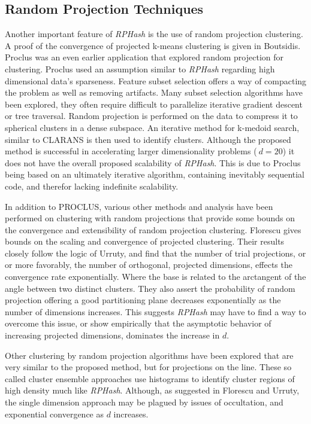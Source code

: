 \documentclass[a4paper,10pt]{article}
\begin{document}
\subsection{Random Projection Techniques} Another important feature of
\emph{RPHash} is the use of random projection clustering.  A proof
of the convergence of projected k-means clustering is given in
Boutsidis\cite{Boutsidis}.  Proclus\cite{Proclus} was an even earlier
application that explored random projection for clustering.  Proclus used
an assumption similar to \emph{RPHash} regarding high dimensional data's
sparseness.  Feature subset selection offers a way of compacting the
problem as well as removing artifacts.	Many subset selection algorithms
have been explored\cite{subset1,subset2,Yang,Kaski98}, they often require
difficult to parallelize iterative gradient descent\cite{Amdahl} or tree
traversal\cite{Freeman}.  Random projection is performed on the data to
compress it to spherical clusters\cite{Dasgupta2000} in a dense subspace.
An iterative method for k-medoid search, similar to CLARANS\cite{Clarans} is
then used to identify clusters.  Although the proposed method is successful
in accelerating larger dimensionality problems ($~d=20$) it does not have
the overall proposed scalability of \emph{RPHash}.  This is due to Proclus
being based on an ultimately iterative algorithm, containing inevitably
sequential code, and therefor lacking indefinite scalability\cite{Amdahl}.

In addition to PROCLUS, various other methods and analysis have been
performed on clustering with random projections that provide some bounds on the
convergence and extensibility of random projection clustering.	Florescu gives
bounds on the scaling and convergence of projected clustering\cite{florescu09}.
Their results closely follow the logic of Urruty\cite{Urruty2007}, and find
that the number of trial projections, or or more favorably, the number of
orthogonal, projected dimensions, effects the convergence rate exponentially.
Where the base is related to the arctangent of the angle between two distinct
clusters.  They also assert the probability of random projection offering a
good partitioning plane decreases exponentially as the number of dimensions
increases.  This suggests \emph{RPHash} may have to find a way to overcome
this issue, or show empirically that the asymptotic behavior of increasing
projected dimensions, dominates the increase in $d$.

Other clustering by random projection algorithms have been explored that are
very similar to the proposed method, but for projections on the line.  These so
called cluster ensemble approaches \cite{fernrandom,alweighted06,avogadri09}
use histograms to identify cluster regions of high density much like
\emph{RPHash}.	Although, as suggested in Florescu and Urruty, the single
dimension approach may be plagued by issues of occultation, and exponential
convergence as $d$ increases.
\end{document}
